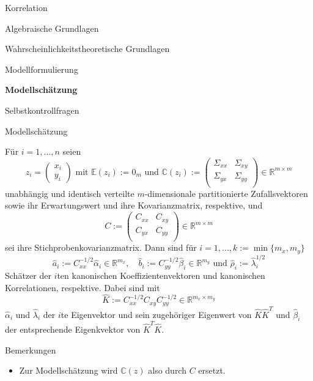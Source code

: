 \documentclass[
  8pt,
  ignorenonframetext,
]{beamer}
\providecommand{\tightlist}{%
  \setlength{\itemsep}{0pt}\setlength{\parskip}{0pt}}
\begin{document}
\begin{frame}{}
\protect\hypertarget{section-8}{}
\vfill
\large

Korrelation

Algebraische Grundlagen

Wahrscheinlichkeitstheoretische Grundlagen

Modellformulierung

\textbf{Modellschätzung}

Selbstkontrollfragen \vfill
\end{frame}

\begin{frame}{Modellschätzung}
\protect\hypertarget{modellschuxe4tzung}{}
\footnotesize
\begin{definition}
Für $i = 1,...,n$ seien
\begin{equation}
z_i = \begin{pmatrix} x_i \\ y_i \end{pmatrix}
\mbox{ mit }
\mathbb{E}(z_i) := 0_m
\mbox{ und }
\mathbb{C}(z_i) :=
\begin{pmatrix}
\Sigma_{xx} & \Sigma_{xy} \\
\Sigma_{yx} & \Sigma_{yy} \\
\end{pmatrix}
\in \mathbb{R}^{m \times m}
\end{equation}
unabhängig und identisch verteilte  $m$-dimensionale partitionierte
Zufallsvektoren sowie ihr Erwartungswert und ihre Kovarianzmatrix, respektive, und
\begin{equation}
C :=
\begin{pmatrix}
C_{xx} & C_{xy} \\
C_{yx} & C_{yy} \\
\end{pmatrix}
\in \mathbb{R}^{m \times m}
\end{equation}
sei ihre Stichprobenkovarianzmatrix. Dann sind für $i = 1,...,k := \min \{m_x,m_y\}$
\begin{equation}
\hat{a}_i := C_{xx}^{-1/2}\hat{\alpha}_i \in \mathbb{R}^{m_x}, \quad
\hat{b}_i := C_{yy}^{-1/2}\hat{\beta}_i \in \mathbb{R}^{m_y} \mbox{ und }
\hat{\rho}_i := \hat{\lambda}_i^{1/2}
\end{equation}
Schätzer der $i$ten kanonischen Koeffizientenvektoren und kanonischen Korrelationen,
respektive. Dabei sind mit
\begin{equation}
\hat{K} := C_{xx}^{-1/2}C_{xy}C_{yy}^{-1/2} \in \mathbb{R}^{m_x \times m_y}
\end{equation}
$\hat{\alpha}_i$ und $\hat{\lambda}_i$ der $i$te Eigenvektor und sein zugehöriger
Eigenwert von $\hat{K}\hat{K}^T$ und $\hat{\beta}_i$ der entsprechende Eigenkvektor
von $\hat{K}^T\hat{K}$.
\end{definition}

Bemerkungen

\begin{itemize}
\tightlist
\item
  Zur Modellschätzung wird \(\mathbb{C}(z)\) also durch \(C\) ersetzt.
\end{itemize}
\end{frame}
\end{document}
